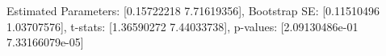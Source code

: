Estimated Parameters: [0.15722218 7.71619356], Bootstrap SE: [0.11510496 1.03707576], t-stats: [1.36590272 7.44033738], p-values: [2.09130486e-01 7.33166079e-05]